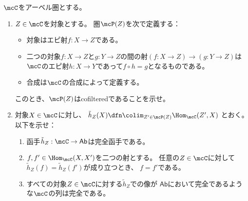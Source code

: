 \documentclass[uplatex,dvipdfmx]{jsarticle}
\begin{document}
\maketitle\HeaderCommentA
\section{}
\fi


\begin{prob}\label{1.7}
  \(\mcC\)をアーベル圏とする。
  \begin{enumerate}
    \item \label{1.7.1}
    \(Z\in \mcC\)を対象とする。
    圏\(\mcP(Z)\)を次で定義する：
    \begin{itemize}
      \item 対象はエピ射\(f:X\to Z\)である。
      \item 二つの対象\(f:X\to Z\)と\(g:Y\to Z\)の間の射\((f:X\to Z)\to (g:Y\to Z)\)は
      \(\mcC\)のエピ射\(h:X\to Y\)であって\(f\circ h = g\)となるものである。
      \item 合成は\(\mcC\)の合成によって定義する。
    \end{itemize}
    このとき、\(\mcP(Z)\)はcofilteredであることを示せ。
    \item \label{1.7.2}
    対象\(X\in \mcC\)に対し、
    \(\tilde{h}_Z(X) \dfn \colim_{Z'\in \mcP(Z)}\Hom_{\mcC}(Z',X)\)
    とおく。
    以下を示せ：
    \begin{enumerate}
      \item \label{1.7.2.1}
      函手\(\tilde{h}_Z:\mcC \to \mathsf{Ab}\)は完全函手である。
      \item \label{1.7.2.2}
      \(f,f'\in \Hom_{\mcC}(X,X')\)を二つの射とする。
      任意の\(Z\in \mcC\)に対して
      \(\tilde{h}_Z(f) = \tilde{h}_Z(f')\)が成り立つとき、
      \(f=f'\)である。
      \item \label{1.7.2.3}
      すべての対象\(Z\in \mcC\)に対する\(\tilde{h}_Z\)での像が
      \(\mathsf{Ab}\)において完全であるような\(\mcC\)の列は完全である。
    \end{enumerate}
  \end{enumerate}
\end{prob}
\end{document}
